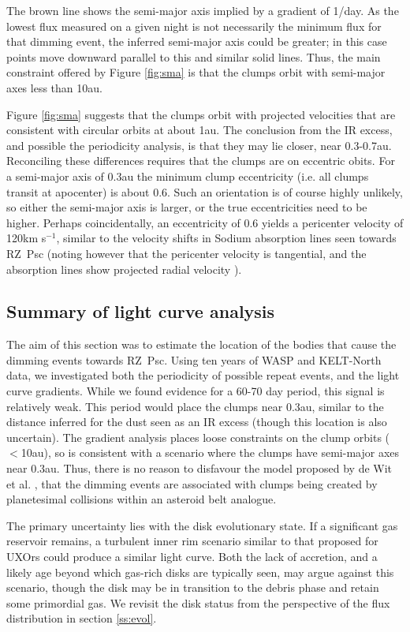 \documentclass[]{rsos}
\begin{document}
The brown line shows the semi-major axis implied by a gradient of 1/day. As the lowest
flux measured on a given night is not necessarily the minimum flux for that dimming
event, the inferred semi-major axis could be greater; in this case points move downward
parallel to this and similar solid lines. Thus, the main constraint offered by Figure
\ref{fig:sma} is that the clumps orbit with semi-major axes less than 10au.

Figure \ref{fig:sma} suggests that the clumps orbit with projected velocities that are
consistent with circular orbits at about 1au. The conclusion from the IR excess, and
possible the periodicity analysis, is that they may lie closer, near
0.3-0.7au. Reconciling these differences requires that the clumps are on eccentric
obits. For a semi-major axis of 0.3au the minimum clump eccentricity (i.e. all clumps
transit at apocenter) is about 0.6. Such an orientation is of course highly unlikely, so
either the semi-major axis is larger, or the true eccentricities need to be
higher. Perhaps coincidentally, an eccentricity of 0.6 yields a pericenter velocity of
120km s$^{-1}$, similar to the velocity shifts in Sodium absorption lines seen towards
RZ~Psc (noting however that the pericenter velocity is tangential, and the absorption
lines show projected radial velocity \cite{2013Ap.....56..453P}).

\subsection{Summary of light curve analysis}\label{ss:wheresum}

The aim of this section was to estimate the location of the bodies that cause the dimming
events towards RZ~Psc. Using ten years of WASP and KELT-North data, we investigated both
the periodicity of possible repeat events, and the light curve gradients. While we found
evidence for a 60-70 day period, this signal is relatively weak. This period would place
the clumps near 0.3au, similar to the distance inferred for the dust seen as an IR excess
(though this location is also uncertain). The gradient analysis places loose constraints
on the clump orbits ($<$10au), so is consistent with a scenario where the clumps have
semi-major axes near 0.3au. Thus, there is no reason to disfavour the model proposed by
de Wit et al. \cite{2013A&A...553L...1D}, that the dimming events are associated with
clumps being created by planetesimal collisions within an asteroid belt analogue.

The primary uncertainty lies with the disk evolutionary state. If a significant gas
reservoir remains, a turbulent inner rim scenario similar to that proposed for UXOrs
could produce a similar light curve. Both the lack of accretion, and a likely age beyond
which gas-rich disks are typically seen, may argue against this scenario, though the disk
may be in transition to the debris phase and retain some primordial gas. We revisit the
disk status from the perspective of the flux distribution in section \ref{ss:evol}.
\end{document}
